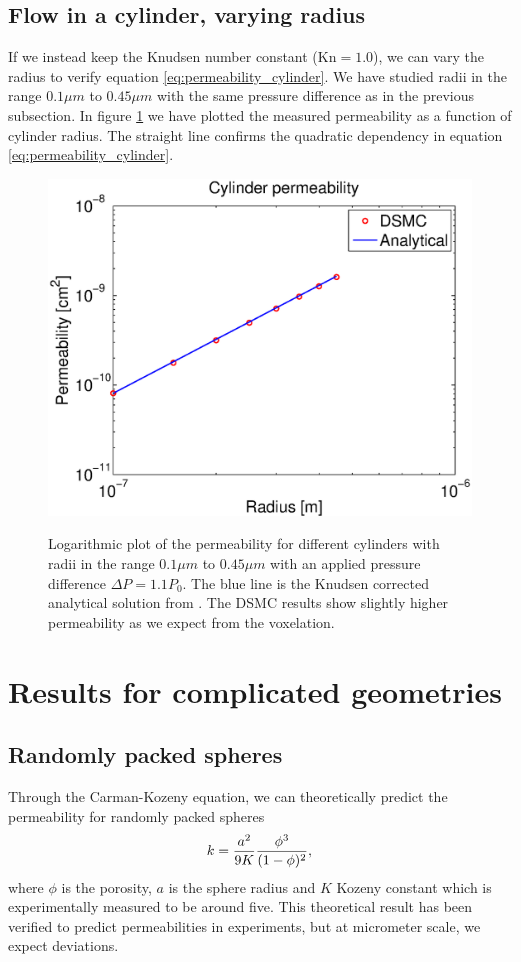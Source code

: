 \subsection{Flow in a cylinder, varying radius}
If we instead keep the Knudsen number constant ($\text{Kn}=1.0$), we can vary the radius to verify equation \eqref{eq:permeability_cylinder}. We have studied radii in the range $0.1 \mu m$ to $0.45 \mu m$ with the same pressure difference as in the previous subsection. In figure \ref{fig:one_cylinder_varying_radii_result} we have plotted the measured permeability as a function of cylinder radius. The straight line confirms the quadratic dependency in equation \eqref{eq:permeability_cylinder}.
\begin{figure}[h]
\begin{center}
\includegraphics[width=\textwidth, trim=0cm 0cm 0cm 0cm, clip]{DSMC/figures/cylinder_radius_permeability.eps}
\label{fig:one_cylinder_varying_radii_result}
\end{center}
\caption{Logarithmic plot of the permeability for different cylinders with radii in the range $0.1 \mu m$ to $0.45 \mu m$ with an applied pressure difference $\Delta P = 1.1P_0$. The blue line is the Knudsen corrected analytical solution from \cite{karniadakis2005microflows}. The DSMC results show slightly higher permeability as we expect from the voxelation.}
\end{figure}
\section{Results for complicated geometries}
\subsection{Randomly packed spheres}
Through the Carman-Kozeny equation, we can theoretically predict the permeability for randomly packed spheres 
\begin{align}
	k = {a^2 \over 9K} {\phi^3 \over (1 - \phi)^2},
\end{align}
where $\phi$ is the porosity, $a$ is the sphere radius and $K$ Kozeny constant which is experimentally measured to be around five\cite{carman1937fluid}. This theoretical result has been verified to predict permeabilities in experiments, but at micrometer scale, we expect deviations. 
